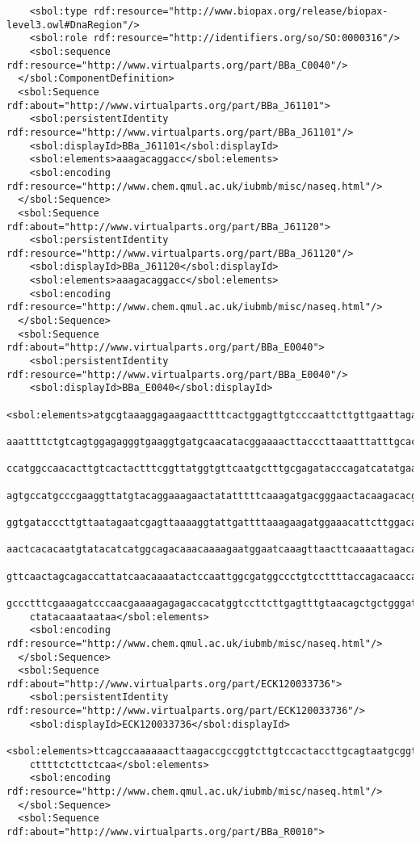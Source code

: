 \begin{lstlisting}
    <sbol:type rdf:resource="http://www.biopax.org/release/biopax-level3.owl#DnaRegion"/>
    <sbol:role rdf:resource="http://identifiers.org/so/SO:0000316"/>
    <sbol:sequence rdf:resource="http://www.virtualparts.org/part/BBa_C0040"/>
  </sbol:ComponentDefinition>
  <sbol:Sequence rdf:about="http://www.virtualparts.org/part/BBa_J61101">
    <sbol:persistentIdentity rdf:resource="http://www.virtualparts.org/part/BBa_J61101"/>
    <sbol:displayId>BBa_J61101</sbol:displayId>
    <sbol:elements>aaagacaggacc</sbol:elements>
    <sbol:encoding rdf:resource="http://www.chem.qmul.ac.uk/iubmb/misc/naseq.html"/>
  </sbol:Sequence>
  <sbol:Sequence rdf:about="http://www.virtualparts.org/part/BBa_J61120">
    <sbol:persistentIdentity rdf:resource="http://www.virtualparts.org/part/BBa_J61120"/>
    <sbol:displayId>BBa_J61120</sbol:displayId>
    <sbol:elements>aaagacaggacc</sbol:elements>
    <sbol:encoding rdf:resource="http://www.chem.qmul.ac.uk/iubmb/misc/naseq.html"/>
  </sbol:Sequence>
  <sbol:Sequence rdf:about="http://www.virtualparts.org/part/BBa_E0040">
    <sbol:persistentIdentity rdf:resource="http://www.virtualparts.org/part/BBa_E0040"/>
    <sbol:displayId>BBa_E0040</sbol:displayId>
    <sbol:elements>atgcgtaaaggagaagaacttttcactggagttgtcccaattcttgttgaattagatggtgatgttaatgggcac
    aaattttctgtcagtggagagggtgaaggtgatgcaacatacggaaaacttacccttaaatttatttgcactactggaaaactacctgtt
    ccatggccaacacttgtcactactttcggttatggtgttcaatgctttgcgagatacccagatcatatgaaacagcatgactttttcaag
    agtgccatgcccgaaggttatgtacaggaaagaactatatttttcaaagatgacgggaactacaagacacgtgctgaagtcaagtttgaa
    ggtgatacccttgttaatagaatcgagttaaaaggtattgattttaaagaagatggaaacattcttggacacaaattggaatacaactat
    aactcacacaatgtatacatcatggcagacaaacaaaagaatggaatcaaagttaacttcaaaattagacacaacattgaagatggaagc
    gttcaactagcagaccattatcaacaaaatactccaattggcgatggccctgtccttttaccagacaaccattacctgtccacacaatct
    gccctttcgaaagatcccaacgaaaagagagaccacatggtccttcttgagtttgtaacagctgctgggattacacatggcatggatgaa
    ctatacaaataataa</sbol:elements>
    <sbol:encoding rdf:resource="http://www.chem.qmul.ac.uk/iubmb/misc/naseq.html"/>
  </sbol:Sequence>
  <sbol:Sequence rdf:about="http://www.virtualparts.org/part/ECK120033736">
    <sbol:persistentIdentity rdf:resource="http://www.virtualparts.org/part/ECK120033736"/>
    <sbol:displayId>ECK120033736</sbol:displayId>
    <sbol:elements>ttcagccaaaaaacttaagaccgccggtcttgtccactaccttgcagtaatgcggtggacaggatcggcggtttt
    cttttctcttctcaa</sbol:elements>
    <sbol:encoding rdf:resource="http://www.chem.qmul.ac.uk/iubmb/misc/naseq.html"/>
  </sbol:Sequence>
  <sbol:Sequence rdf:about="http://www.virtualparts.org/part/BBa_R0010">

\end{lstlisting}
